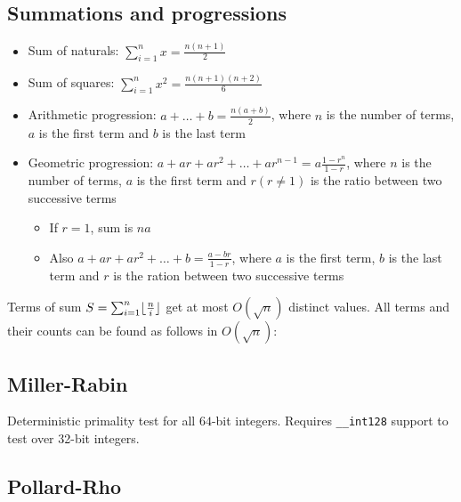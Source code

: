 \documentclass{article}
\DeclarePairedDelimiter\floor{\lfloor}{\rfloor} %
\begin{document}


\subsection {Summations and progressions}

\begin{itemize}

	\item Sum of naturals: $\sum_{i=1}^{n} x = \frac{n(n+1)}{2}$
	\item Sum of squares: $\sum_{i=1}^{n} x^2 = \frac{n(n+1)(n+2)}{6}$
	\item Arithmetic progression: $a + \dots + b = \frac{n(a+b)}{2}$, where $n$ is the number of terms, $a$ is the first term and $b$ is the last term
	\item Geometric progression: $a + ar + ar^2 + \dots + ar^{n-1} = a \frac{1-r^n}{1-r}$, where $n$ is the number of terms, $a$ is the first term and $r (r \neq 1)$ is the ratio between two successive terms
	\begin{itemize}
		\item If $r = 1$, sum is $na$
		\item Also $a + ar + ar^2 + \dots + b = \frac{a-br}{1-r}$, where $a$ is the first term, $b$ is the last term and $r$ is the ration between two successive terms
	\end{itemize}

\end{itemize}

Terms of sum $S = \sum_{i=1}^{n} \floor{\frac{n}{i}}$ get at most $O(\sqrt{n})$ distinct values. All terms and their counts can be found as follows in $O(\sqrt{n})$:



\subsection {Miller-Rabin}

Deterministic primality test for all $64$-bit integers. Requires \verb|__int128| support to test over 32-bit integers.



\subsection {Pollard-Rho}
\end{document}
